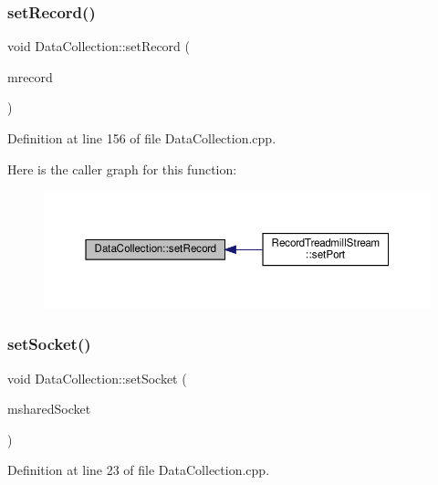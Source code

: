 \subsubsection{\texorpdfstring{set\+Record()}{setRecord()}}
{\footnotesize\ttfamily void Data\+Collection\+::set\+Record (\begin{DoxyParamCaption}\item[{bool}]{mrecord }\end{DoxyParamCaption})}



Definition at line 156 of file Data\+Collection.\+cpp.

Here is the caller graph for this function\+:
\nopagebreak
\begin{figure}[H]
\begin{center}
\leavevmode
\includegraphics[width=350pt]{class_data_collection_a552bd8c19edeb3bed687a1ee8066ac4a_icgraph}
\end{center}
\end{figure}
\mbox{\label{class_data_collection_a340ae86497b8b0f29d4911cf7dc8d0da}} 
\subsubsection{\texorpdfstring{set\+Socket()}{setSocket()}}
{\footnotesize\ttfamily void Data\+Collection\+::set\+Socket (\begin{DoxyParamCaption}\item[{Q\+Abstract\+Socket $\ast$}]{mshared\+Socket }\end{DoxyParamCaption})}



Definition at line 23 of file Data\+Collection.\+cpp.

